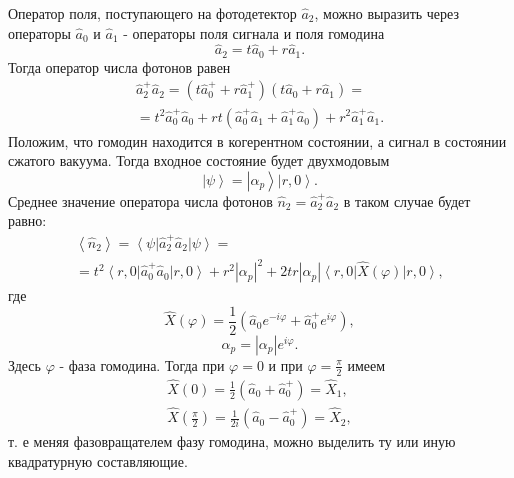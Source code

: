 Оператор поля, поступающего на фотодетектор $\hat{a}_2$, можно выразить
через операторы $\hat{a}_0$ и $\hat{a}_1$ - операторы поля сигнала и
поля гомодина
\begin{equation}
\hat{a}_2 = t \hat{a}_0 + r\hat{a}_1.
\nonumber
\end{equation}
Тогда оператор числа фотонов равен
\begin{eqnarray}
\hat{a}_2^{+}\hat{a}_2 = 
\left(t \hat{a}_0^{+} + r\hat{a}_1^{+}\right)
\left(t \hat{a}_0 + r\hat{a}_1\right) = 
\nonumber \\
=
t^2\hat{a}_0^{+}\hat{a}_0 + r t \left(
\hat{a}_0^{+}\hat{a}_1 + \hat{a}_1^{+}\hat{a}_0 
\right) +
r^2\hat{a}_1^{+}\hat{a}_1.
\nonumber
\end{eqnarray}
Положим, что гомодин находится в когерентном состоянии, а сигнал в
состоянии сжатого вакуума. Тогда входное состояние будет двухмодовым 
\[
\left|\psi\right> = 
\left|\alpha_p\right> \left|r, 0\right>.
\]
Среднее значение оператора числа фотонов $\hat{n}_2 =
\hat{a}_2^{+}\hat{a}_2$ в таком случае будет равно:
\begin{eqnarray}
\left<\hat{n}_2\right> = 
\left<\psi\right|\hat{a}_2^{+}\hat{a}_2\left|\psi\right> = 
\nonumber \\
=
t^2\left<r, 0\right|\hat{a}_0^{+}\hat{a}_0\left|r, 0\right> + 
r^2 \left|\alpha_p\right|^2 + 2 t r \left|\alpha_p\right|
\left<r, 0\right|\hat{X}\left(\varphi\right)\left|r, 0\right>,
\label{eqPart3SqueezedAdd3}
\end{eqnarray}
где
\[
\hat{X}\left(\varphi\right) = \frac{1}{2}\left(
\hat{a}_0 e^{-i \varphi} +
\hat{a}_0^{+} e^{i \varphi}
\right),
\]
\[
\alpha_p = 
\left|\alpha_p\right|
 e^{i \varphi}.
\]
Здесь $\varphi$ - фаза гомодина. Тогда при $\varphi = 0$ и при 
$\varphi = \frac{\pi}{2}$ имеем
\begin{eqnarray}
\hat{X}\left(0\right) = 
\frac{1}{2}\left(\hat{a}_0 + \hat{a}_0^{+}\right) = \hat{X}_1,
\nonumber \\
\hat{X}\left(\frac{\pi}{2}\right) = 
\frac{1}{2i}\left(\hat{a}_0 - \hat{a}_0^{+}\right) = \hat{X}_2,
\nonumber
\end{eqnarray}
т. е меняя фазовращателем фазу гомодина, можно выделить ту или иную
квадратурную составляющие.

